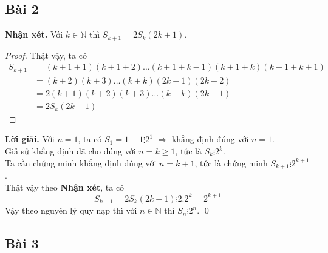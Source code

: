 \documentclass[a4paper,14pt]{article}
\begin{document}
    \subsection{Bài 2}
        \textbf{Nhận xét.} Với $k\in \mathbb{N}$ thì $S_{k+1}=2S_k(2k+1)$.
            \begin{proof}
               Thật vậy, ta có
                \begin{align*}
                    S_{k+1}&=(k+1+1)(k+1+2)\ldots(k+1+k-1)(k+1+k)(k+1+k+1)
                    \\&=(k+2)(k+3)\ldots(k+k)(2k+1)(2k+2)
                    \\&=2(k+1)(k+2)(k+3)\ldots(k+k)(2k+1)
                    \\&=2S_k(2k+1)
                \end{align*}
            \end{proof}
        \noindent\textbf{Lời giải.}
            Với $n=1$, ta có $S_1=1+1  \vdots  2^1$ $\Rightarrow$ khẳng định đúng với $n=1$. \\
            Giả sử khẳng định đã cho đúng với $n=k\geqslant 1$, tức là $S_k  \vdots  2^k$. \\
            Ta cần chứng minh khẳng định đúng với $n=k+1$, tức là chứng minh $S_{k+1} \vdots  2^{k+1}$. \\
            Thật vậy theo \textbf{Nhận xét}, ta có
                \[
                    S_{k+1}=2S_k(2k+1) \vdots 2.2^k=2^{k+1}
                \]
            Vậy theo nguyên lý quy nạp thì với $n\in \mathbb{N}$ thì $S_n \vdots 2^n$.
        \qed
    \subsection{Bài 3}
\end{document}
